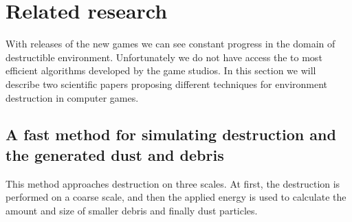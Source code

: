 \section{Related research}
With releases of the new games we can see constant progress in the domain of destructible environment. Unfortunately we do not have access the to most efficient algorithms developed by the game studios. In this section we will describe two scientific papers proposing different techniques for environment destruction in computer games. 

\subsection{A fast method for simulating destruction and the generated dust
and debris}
\label{sec:edem}
This method \cite{edem} approaches destruction on three scales. At first, the destruction is performed on a coarse scale, and then the applied energy is used to calculate the amount and size of smaller debris and finally dust particles.

